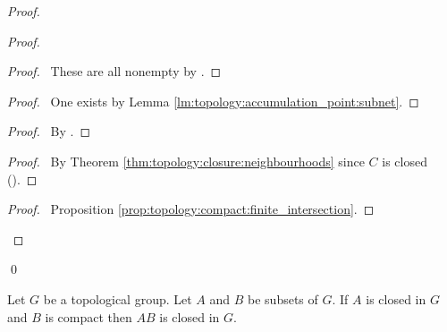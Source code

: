 \begin{proof}
\begin{proof}
   \begin{proof}
     \pf\ These are all nonempty by .
   \end{proof}
   \begin{proof}
    \pf\ One exists by Lemma \ref{lm:topology:accumulation_point:subnet}.
   \end{proof}
   \begin{proof}
     \pf\ By .
   \end{proof}
   \begin{proof}
    \pf\ By Theorem \ref{thm:topology:closure:neighbourhoods} since $C$ is
    closed ().
   \end{proof}
   \qedstep
   \begin{proof}
     \pf\ Proposition \ref{prop:topology:compact:finite_intersection}.
   \end{proof}
 \end{proof}
 \qed
\end{proof}

\begin{cor}[AC]
 Let $G$ be a topological group. Let $A$ and $B$ be subsets of $G$. If $A$ is
closed in $G$ and $B$ is compact then $AB$ is closed in $G$.
\end{cor}

